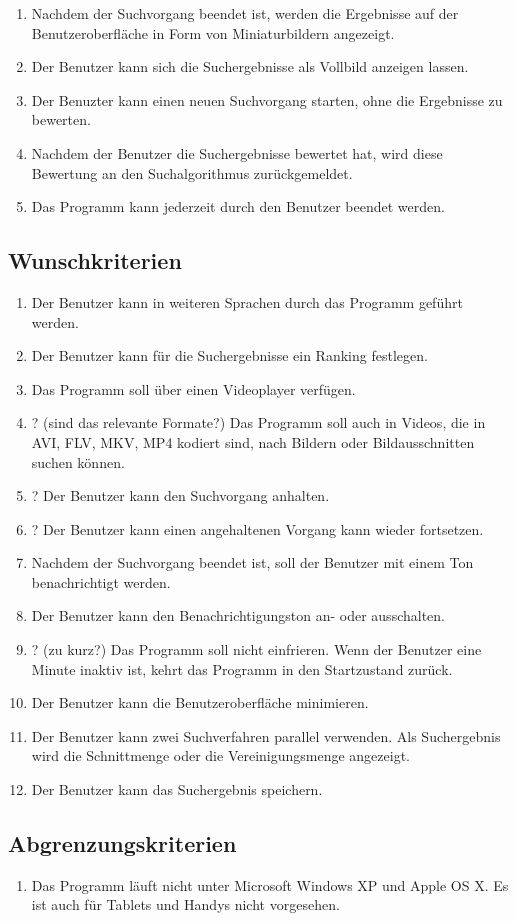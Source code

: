 \begin{enumerate} [label=\bfseries /MK \arabic*0/]
\item Nachdem der Suchvorgang beendet ist, werden die Ergebnisse auf der Benutzeroberfläche in Form von Miniaturbildern angezeigt.
\item Der Benutzer kann sich die Suchergebnisse als Vollbild anzeigen lassen.
\item Der Benuzter kann einen neuen Suchvorgang starten, ohne die Ergebnisse zu bewerten.
\item Nachdem der Benutzer die Suchergebnisse bewertet hat, wird diese Bewertung an den Suchalgorithmus zurückgemeldet.
\item Das Programm kann jederzeit durch den Benutzer beendet werden.
\end{enumerate}
\subsection{Wunschkriterien}
\begin{enumerate} [label=\bfseries /WK \arabic*0/]
\item Der Benutzer kann in weiteren Sprachen durch das Programm geführt werden.
\item Der Benutzer kann für die Suchergebnisse ein Ranking festlegen. 
\item Das Programm soll über einen Videoplayer verfügen.
\item ? (sind das relevante Formate?) Das Programm soll auch in Videos, die in AVI, FLV, MKV, MP4 kodiert sind, nach Bildern oder Bildausschnitten suchen können.
\item ? Der Benutzer kann den Suchvorgang anhalten.
\item ? Der Benutzer kann einen angehaltenen Vorgang kann wieder fortsetzen.
\item Nachdem der Suchvorgang beendet ist, soll der Benutzer mit einem Ton benachrichtigt werden.
\item Der Benutzer kann den Benachrichtigungston an- oder ausschalten.
\item ? (zu kurz?) Das Programm soll nicht einfrieren. Wenn der Benutzer eine Minute inaktiv ist, kehrt das Programm in den Startzustand zurück.
\item Der Benutzer kann die Benutzeroberfläche minimieren. 
\item Der Benutzer kann zwei Suchverfahren parallel verwenden. Als Suchergebnis wird die Schnittmenge oder die Vereinigungsmenge angezeigt.
\item Der Benutzer kann das Suchergebnis speichern. 
\end{enumerate}
\subsection{Abgrenzungskriterien}
\begin{enumerate} [label=\bfseries /AK \arabic*0/]
\item Das Programm läuft nicht unter Microsoft Windows XP und  Apple OS X. Es ist auch für Tablets und Handys nicht vorgesehen.
\end{enumerate}
